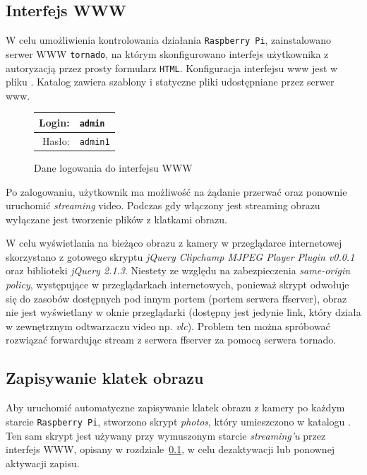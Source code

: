 \documentclass{article}
\begin{document}
\subsection{Interfejs WWW}
\label{sec:www}

W celu umożliwienia kontrolowania działania \texttt{Raspberry~Pi}, zainstalowano serwer WWW \texttt{tornado}, na którym skonfigurowano interfejs użytkownika z autoryzacją przez prosty formularz \texttt{HTML}. Konfiguracja interfejsu www jest w pliku . Katalog  zawiera szablony i statyczne pliki udostępniane przez serwer www.
\begin{figure}[H]
\centering
\begin{tabular}{r|l}
Login: & \texttt{admin}\\
\hline
Hasło: & \texttt{admin1}\\
\end{tabular}
\caption{Dane logowania do interfejsu WWW}
\end{figure}
Po zalogowaniu, użytkownik ma możliwość na żądanie przerwać oraz ponownie uruchomić \emph{streaming} video. Podczas gdy włączony jest streaming obrazu wyłączane jest tworzenie plików z klatkami obrazu.

W celu wyświetlania na bieżąco obrazu z kamery w przeglądarce internetowej skorzystano z gotowego skryptu \emph{jQuery Clipchamp MJPEG Player Plugin v0.0.1} oraz biblioteki \emph{jQuery 2.1.3}. Niestety ze względu na zabezpieczenia \emph{same-origin policy}, występujące w przeglądarkach internetowych, ponieważ skrypt odwołuje się do zasobów dostępnych pod innym portem (portem serwera ffserver), obraz nie jest wyświetlany w oknie przeglądarki (dostępny jest jedynie link, który działa w zewnętrznym odtwarzaczu video np. \emph{vlc}). Problem ten można spróbować rozwiązać forwardując stream z serwera ffserver za pomocą serwera tornado.


\subsection{Zapisywanie klatek obrazu}

Aby uruchomić automatyczne zapisywanie klatek obrazu z kamery po każdym starcie \texttt{Raspberry~Pi}, stworzono skrypt \emph{photos}, który umieszczono w katalogu . Ten sam skrypt jest używany przy wymuszonym starcie \emph{streaming'u} przez interfejs WWW, opisany w rozdziale~\ref{sec:www}, w celu dezaktywacji lub ponownej aktywacji zapisu.
\end{document}
